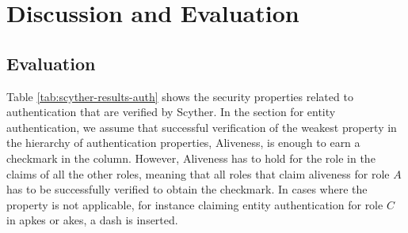 \chapter{Discussion and Evaluation}
\label{chp:discussion}



\section{Evaluation}


Table \ref{tab:scyther-results-auth} shows the security properties related to authentication that are verified by Scyther. In the section for entity authentication, we assume that successful verification of the weakest property in the hierarchy of authentication properties, Aliveness, is enough to earn a checkmark in the column. However, Aliveness has to hold for the role in the claims of all the other roles, meaning that all roles that claim aliveness for role $A$ has to be successfully verified to obtain the checkmark. In cases where the property is not applicable, for instance claiming entity authentication for role $C$ in \gls{apkes} or \gls{akes}, a dash is inserted.

\begin{table}[h]
\centering
{}
\caption{Table of the security properties for authentication that are satisfied in the different protocols.}
\label{tab:scyther-results-auth}
\end{table}

